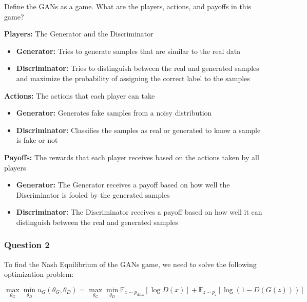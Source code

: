 Define the GANs as a game. What are the players, actions, and payoffs in this game?
\begin{qsolve}
    \begin{qsolve}[]
        \textbf{Players:} The Generator and the Discriminator
        \begin{itemize}
            \item \textbf{Generator:} Tries to generate samples that are similar to the real data
            \item \textbf{Discriminator:} Tries to distinguish between the real and generated samples and maximize the probability of assigning the correct label to the samples
        \end{itemize}
        \textbf{Actions:} The actions that each player can take
        \begin{itemize}
            \item \textbf{Generator:} Generates fake samples from a noisy distribution
            \item \textbf{Discriminator:} Classifies the samples as real or generated to know a sample is fake or not
        \end{itemize}
        \textbf{Payoffs:} The rewards that each player receives based on the actions taken by all players
        \begin{itemize}
            \item \textbf{Generator:} The Generator receives a payoff based on how well the Discriminator is fooled by the generated samples
            \item \textbf{Discriminator:} The Discriminator receives a payoff based on how well it can distinguish between the real and generated samples
        \end{itemize}
    \end{qsolve}
\end{qsolve}
\subsubsection{Question 2}

To find the Nash Equilibrium of the GANs game, we need to solve the following optimization problem:

\[
\max_{\theta_G} \min_{\theta_D} u_G(\theta_G, \theta_D) = \max_{\theta_G} \min_{\theta_D} \mathbb{E}_{x \sim p_{\text{data}}} [\log D(x)] + \mathbb{E}_{z \sim p_z} [\log (1 - D(G(z)))]
\]

